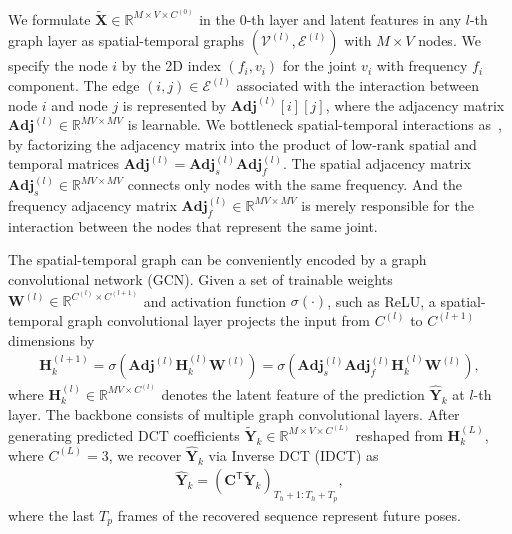 We formulate $\widetilde{\mathbf {X}} \in \mathbb{R}^{M \times V \times C^{(0)}}$ in the $0$-th layer and latent features in any $l$-th graph layer as spatial-temporal graphs $(\mathcal{V}^{(l)}, \mathcal{E}^{(l)})$ with $M \times V$ nodes. We specify the node $i$ by the 2D index $(f_i, v_i)$ for the joint $v_i$ with frequency $f_i$ component. The edge $(i, j) \in \mathcal{E}^{(l)}$ associated with the interaction between node $i$ and node $j$ is represented by $\mathbf {Adj}^{(l)}[i][j]$, where the adjacency matrix $\mathbf {Adj}^{(l)} \in \mathbb{R}^{M V\times M V}$ is learnable. We bottleneck spatial-temporal interactions as~\cite{Sofianos_2021_ICCV}, by factorizing the adjacency matrix into the product of low-rank spatial and temporal matrices $\mathbf {Adj}^{(l)} = \mathbf {Adj}^{(l)}_{s} \mathbf {Adj}^{(l)}_{f}$. The spatial adjacency matrix $\mathbf {Adj}^{(l)}_{s} \in \mathbb{R}^{M V\times M V}$ connects only nodes with the same frequency. And the frequency adjacency matrix $\mathbf {Adj}^{(l)}_{f} \in \mathbb{R}^{M V\times M V}$ is merely responsible for the interaction between the nodes that represent the same joint.



The spatial-temporal graph can be conveniently encoded by a graph convolutional network (GCN). Given a set of trainable weights $\mathbf W^{(l)} \in \mathbb{R}^{C^{(l)}\times C^{(l+1)}}$ and activation function $\sigma(\cdot)$, such as ReLU, a spatial-temporal graph convolutional layer projects the input from $C^{(l)}$ to $C^{(l+1)}$ dimensions by
\begin{align}\label{eq:1}
    \mathbf{H}^{(l+1)}_k = \sigma(\mathbf {Adj}^{(l)}\mathbf{H}^{(l)}_k\mathbf W^{(l)})=\sigma(\mathbf {Adj}_{s}^{(l)}\mathbf {Adj}_{f}^{(l)}\mathbf{H}^{(l)}_k\mathbf W^{(l)}),
\end{align}
where $\mathbf{H}^{(l)}_k \in \mathbb{R}^{M V \times C^{(l)}}$ denotes the latent feature of the prediction $\mathbf{\widehat{Y}}_k$ at $l$-th layer. 
The backbone consists of multiple graph convolutional layers. After generating predicted DCT coefficients $\widetilde{\mathbf {Y}}_k \in \mathbb{R}^{M \times V \times C^{(L)}}$ reshaped from $\mathbf{H}^{(L)}_k$, where $C^{(L)} = 3$, we recover $\mathbf{\widehat{Y}}_k$ via Inverse DCT (IDCT) as
\begin{align}
    \mathbf {\widehat Y}_k = (\mathbf{C^\mathsf{T}}\widetilde{\mathbf {Y}}_k)_{T_h+1:T_h+T_p},
\end{align}
where the last $T_p$ frames of the recovered sequence represent future poses.

